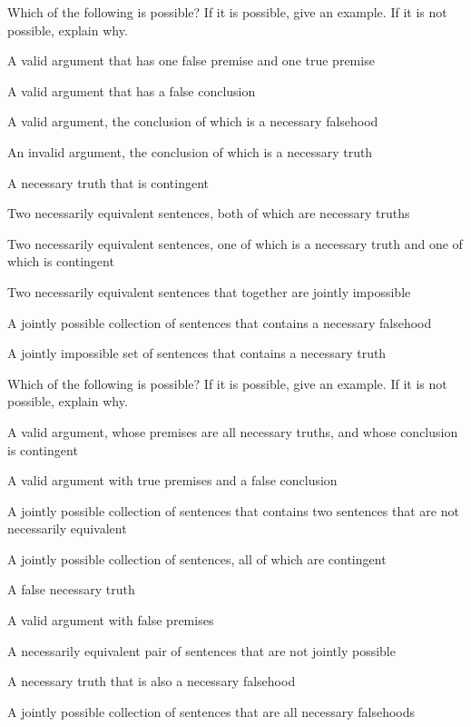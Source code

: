 \problempart
\label{pr.EnglishCombinations2}
Which of the following is possible? If it is possible, give an example. If it is not possible, explain why.
\begin{earg}
\item A valid argument that has one false premise and one true premise

\item A valid argument that has a false conclusion

\item A valid argument, the conclusion of which is a necessary falsehood

\item An invalid argument, the conclusion of which is a necessary truth

\item A necessary truth that is contingent

\item Two necessarily equivalent sentences, both of which are necessary truths

\item Two necessarily equivalent sentences, one of which is a necessary truth and one of which is contingent

\item Two necessarily equivalent sentences that together are jointly impossible

\item A jointly possible collection of sentences that contains a necessary falsehood

\item A jointly impossible set of sentences that contains a necessary truth
\end{earg}

\problempart
Which of the following is possible? If it is possible, give an example. If it is not possible, explain why.

\begin{earg}
\item A valid argument, whose premises are all necessary truths, and whose conclusion is contingent
\item A valid argument with true premises and a false conclusion
\item A jointly possible collection of sentences that contains two sentences that are not necessarily equivalent
\item A jointly possible collection of sentences, all of which are contingent
\item A false necessary truth
\item A valid argument with false premises
\item A necessarily equivalent pair of sentences that are not jointly possible
\item A necessary truth that is also a necessary falsehood
\item A jointly possible collection of sentences that are all necessary falsehoods
\end{earg}
